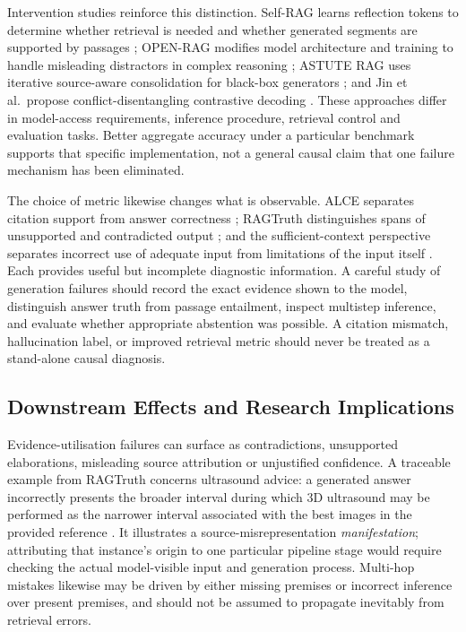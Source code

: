 Intervention studies reinforce this distinction. Self-RAG learns reflection tokens to determine whether retrieval is needed and whether generated segments are supported by passages \cite[Sec.~3]{asai2024selfrag}; OPEN-RAG modifies model architecture and training to handle misleading distractors in complex reasoning \cite[Secs.~3--4]{islam2024openrag}; ASTUTE RAG uses iterative source-aware consolidation for black-box generators \cite[Secs.~4--5]{wang2025astute}; and Jin et al.\ propose conflict-disentangling contrastive decoding \cite[Sec.~5]{jin2024tug}. These approaches differ in model-access requirements, inference procedure, retrieval control and evaluation tasks. Better aggregate accuracy under a particular benchmark supports that specific implementation, not a general causal claim that one failure mechanism has been eliminated.

The choice of metric likewise changes what is observable. ALCE separates citation support from answer correctness \cite{gao2023alce}; RAGTruth distinguishes spans of unsupported and contradicted output \cite{niu2024ragtruth}; and the sufficient-context perspective separates incorrect use of adequate input from limitations of the input itself \cite{joren2025sufficient}. Each provides useful but incomplete diagnostic information. A careful study of generation failures should record the exact evidence shown to the model, distinguish answer truth from passage entailment, inspect multistep inference, and evaluate whether appropriate abstention was possible. A citation mismatch, hallucination label, or improved retrieval metric should never be treated as a stand-alone causal diagnosis.

\subsection{Downstream Effects and Research Implications}
\label{subsec:s9-downstream}

Evidence-utilisation failures can surface as contradictions, unsupported elaborations, misleading source attribution or unjustified confidence. A traceable example from RAGTruth concerns ultrasound advice: a generated answer incorrectly presents the broader interval during which 3D ultrasound may be performed as the narrower interval associated with the best images in the provided reference \cite[Table~1]{niu2024ragtruth}. It illustrates a source-misrepresentation \emph{manifestation}; attributing that instance's origin to one particular pipeline stage would require checking the actual model-visible input and generation process. Multi-hop mistakes likewise may be driven by either missing premises or incorrect inference over present premises, and should not be assumed to propagate inevitably from retrieval errors.

